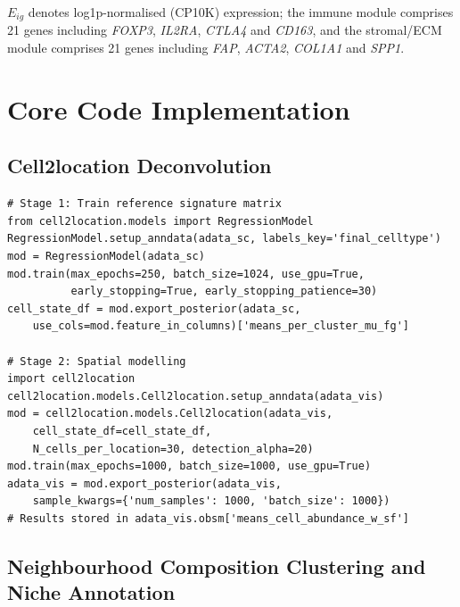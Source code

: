 \documentclass[12pt, a4paper]{article}
\begin{document}
$E_{ig}$ denotes log1p-normalised (CP10K) expression; the immune module comprises 21 genes including \textit{FOXP3}, \textit{IL2RA}, \textit{CTLA4} and \textit{CD163}, and the stromal/ECM module comprises 21 genes including \textit{FAP}, \textit{ACTA2}, \textit{COL1A1} and \textit{SPP1}.

\section{Core Code Implementation}
\label{app:code}

\subsection{Cell2location Deconvolution}

\begin{lstlisting}[caption={Core code for RegressionModel training and spatial modelling}]
# Stage 1: Train reference signature matrix
from cell2location.models import RegressionModel
RegressionModel.setup_anndata(adata_sc, labels_key='final_celltype')
mod = RegressionModel(adata_sc)
mod.train(max_epochs=250, batch_size=1024, use_gpu=True,
          early_stopping=True, early_stopping_patience=30)
cell_state_df = mod.export_posterior(adata_sc,
    use_cols=mod.feature_in_columns)['means_per_cluster_mu_fg']

# Stage 2: Spatial modelling
import cell2location
cell2location.models.Cell2location.setup_anndata(adata_vis)
mod = cell2location.models.Cell2location(adata_vis,
    cell_state_df=cell_state_df,
    N_cells_per_location=30, detection_alpha=20)
mod.train(max_epochs=1000, batch_size=1000, use_gpu=True)
adata_vis = mod.export_posterior(adata_vis,
    sample_kwargs={'num_samples': 1000, 'batch_size': 1000})
# Results stored in adata_vis.obsm['means_cell_abundance_w_sf']
\end{lstlisting}

\subsection{Neighbourhood Composition Clustering and Niche Annotation}
\end{document}
